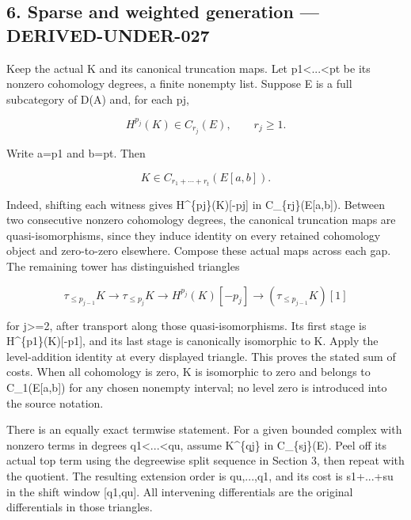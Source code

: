 \documentclass[11pt]{article}
\begin{document}
\subsection{6. Sparse and weighted generation --- DERIVED-UNDER-027}\label{proofs-10691-11108-sparse-and-weighted-generation-derived-under-027}

Keep the actual K and its canonical truncation maps. Let p1\textless...\textless pt be its nonzero cohomology degrees,\allowbreak{} a finite nonempty list. Suppose E is a full subcategory of D(A)\allowbreak{} and,\allowbreak{} for each pj,\allowbreak{}

\[
 H^{p_j}(K)\in C_{r_j}(E),\qquad r_j\geq1.
\]

Write a\allowbreak{}=p1 and b\allowbreak{}=pt. Then

\[
 K\in C_{r_1+\cdots+r_t}(E[a,b]).
\]

Indeed,\allowbreak{} shifting each witness gives H\textasciicircum{}\{pj\}(K)\allowbreak{}[-pj]\allowbreak{} in C\_\allowbreak{}\{rj\}(E[a,\allowbreak{}b]\allowbreak{})\allowbreak{}. Between two consecutive nonzero cohomology degrees,\allowbreak{} the canonical truncation maps are quasi-isomorphisms,\allowbreak{} since they induce identity on every retained cohomology object and zero-to-zero elsewhere. Compose these actual maps across each gap. The remaining tower has distinguished triangles

\[
 \tau_{\leq p_{j-1}}K\longrightarrow\tau_{\leq p_j}K
 \longrightarrow H^{p_j}(K)[-p_j]
 \longrightarrow(\tau_{\leq p_{j-1}}K)[1]
\]

for j>\allowbreak{}=2,\allowbreak{} after transport along those quasi-isomorphisms. Its first stage is H\textasciicircum{}\{p1\}(K)\allowbreak{}[-p1]\allowbreak{},\allowbreak{} and its last stage is canonically isomorphic to K. Apply the level-addition identity at every displayed triangle. This proves the stated sum of costs. When all cohomology is zero,\allowbreak{} K is isomorphic to zero and belongs to C\_\allowbreak{}1(E[a,\allowbreak{}b]\allowbreak{})\allowbreak{} for any chosen nonempty interval; no level zero is introduced into the source notation.

There is an equally exact termwise statement. For a given bounded complex with nonzero terms in degrees q1<...<qu,\allowbreak{} assume K\^{}\{qj\} in C\_\allowbreak{}\{sj\}(E)\allowbreak{}. Peel off its actual top term using the degreewise split sequence in Section 3,\allowbreak{} then repeat with the quotient. The resulting extension order is qu,\allowbreak{}...,\allowbreak{}q1,\allowbreak{} and its cost is s1\allowbreak{}+...\allowbreak{}+su in the shift window [q1,\allowbreak{}qu]\allowbreak{}. All intervening differentials are the original differentials in those triangles.
\end{document}
